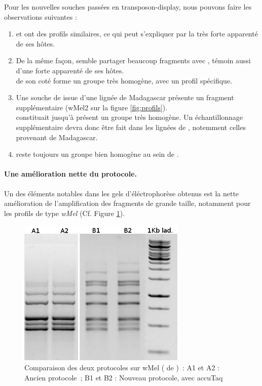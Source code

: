 Pour les nouvelles souches passées en transposon-display, nous pouvons faire les observations suivantes : 
\begin{enumerate}
	\item {} et  ont des profils similaires, ce qui peut s’expliquer par la très forte apparenté de ses hôtes.
	\item De la même façon,  semble partager beaucoup fragments avec , témoin aussi d’une forte apparenté de ses hôtes.\\
	 de son coté forme un groupe très homogène, avec un profil spécifique.
	\item Une souche de  issue d’une lignée de Madagascar présente un fragment supplémentaire (wMel2 sur la figure \ref{fig:profils}).\\
	 constituait jusqu’à présent un groupe très homogène.
	Un échantillonnage supplémentaire devra donc être fait dans les lignées de , notemment celles provenant de Madagascar.
	\item {} reste toujours un groupe bien homogène au sein de .
\end{enumerate}



\paragraph{Une amélioration nette du protocole.} %
\label{par:proto}
Un des éléments notables dans les gels d'éléctrophorèse obtenus est la nette amélioration de l'amplification des fragments de grande taille, notamment pour les profils de type \textit{wMel} (Cf. Figure \ref{fig:wMelcomp}). 

\begin{figure}[h]
	\begin{center}
		\includegraphics[width=80mm]{images/wMel_comp.png}
	\end{center}
	\caption{Comparaison des deux protocoles sur wMel ( de )~:
	A1 et A2 : Ancien protocole\cite{memHH}~;
	B1 et B2 : Nouveau protocole, avec accuTaq}
	\label{fig:wMelcomp}
\end{figure}

